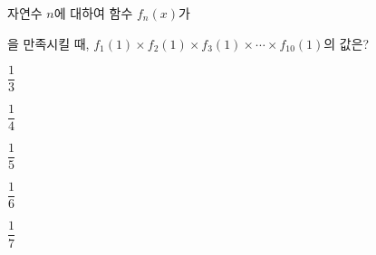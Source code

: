 자연수 $n$에 대하여 함수 $f_n(x)$가 \par\smallskip{}\par\smallskip\noindent 을 만족시킬 때, $f_1(1)\times f_2(1)\times f_3(1)\times\cdots\times f_{10}(1)$의 값은?
\begin{choices32}{\rule[-3ex]{0pt}{8ex}$\dfrac{1}{3}$}{\rule[-3ex]{0pt}{8ex}$\dfrac{1}{4}$}{\rule[-3ex]{0pt}{8ex}$\dfrac{1}{5}$}{\rule[-3ex]{0pt}{8ex}$\dfrac{1}{6}$}{\rule[-3ex]{0pt}{8ex}$\dfrac{1}{7}$}\end{choices32}
